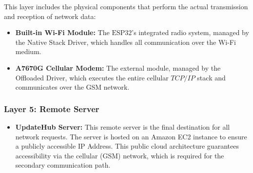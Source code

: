 This layer includes the physical components that perform the actual transmission and reception of network data:

\begin{itemize}
    \item \textbf{Built-in Wi-Fi Module:} The $\text{ESP32}$'s integrated radio system, managed by the Native Stack Driver, which handles all communication over the Wi-Fi medium.
    \item \textbf{A7670G Cellular Modem:} The external module, managed by the Offloaded Driver, which executes the entire cellular $TCP/IP$ stack and communicates over the GSM network.
\end{itemize}

\subsubsection{Layer 5: Remote Server}
\label{sssec:remote_server}

\begin{itemize} \item \textbf{UpdateHub Server:} This remote server is the final destination for all network requests. The server is hosted on an Amazon EC2 instance to ensure a publicly accessible IP Address. This public cloud architecture guarantees accessibility via the cellular (GSM) network, which is required for the secondary communication path.
\end{itemize}